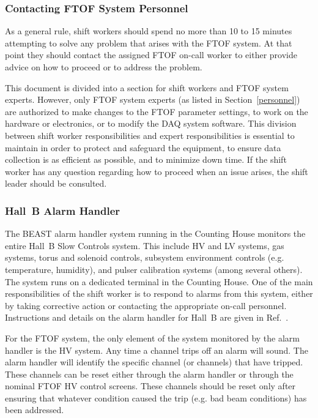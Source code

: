 \documentclass[12pt]{article}
\begin{document}
\subsubsection{Contacting FTOF System Personnel}
\label{contact}

As a general rule, shift workers should spend no more than 10 to 15 minutes attempting to solve
any problem that arises with the FTOF system. At that point they should contact the assigned 
FTOF on-call worker to either provide advice on how to proceed or to address the problem.

This document is divided into a section for shift workers and FTOF system experts. However, only 
FTOF system experts (as listed in Section~\ref{personnel}) are authorized to make changes to the 
FTOF parameter settings, to work on the hardware or electronics, or to modify the DAQ system 
software. This division between shift worker responsibilities and expert responsibilities is
essential to maintain in order to protect and safeguard the equipment, to ensure data collection
is as efficient as possible, and to minimize down time. If the shift worker has any question 
regarding how to proceed when an issue arises, the shift leader should be consulted.

\subsubsection{Hall~B Alarm Handler}
\label{alarms}

The BEAST alarm handler system running in the Counting House monitors the entire Hall~B Slow Controls
system. This include HV and LV systems, gas systems, torus and solenoid controls, subsystem
environment controls (e.g. temperature, humidity), and pulser calibration systems (among several
others). The system runs on a dedicated terminal in the Counting House. One of the main responsibilities
of the shift worker is to respond to alarms from this system, either by taking corrective action
or contacting the appropriate on-call personnel. Instructions and details on the alarm handler for Hall~B
are given in Ref.~\cite{beast}.

For the FTOF system, the only element of the system monitored by the alarm handler is the HV system.
Any time a channel trips off an alarm will sound. The alarm handler will identify the specific
channel (or channels) that have tripped. These channels can be reset either through the alarm handler
or through the nominal FTOF HV control screens. These channels should be reset only after ensuring
that whatever condition caused the trip (e.g. bad beam conditions) has been addressed.
\end{document}
